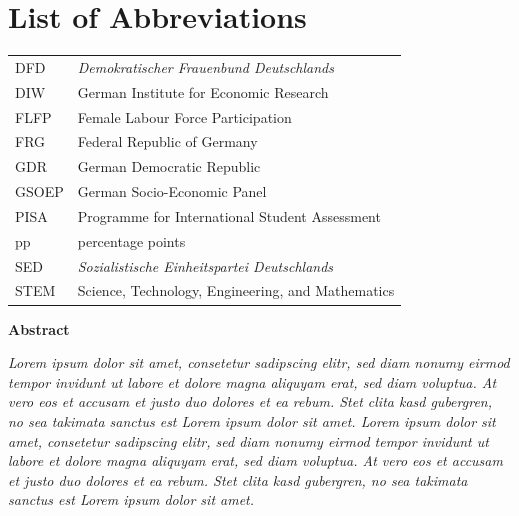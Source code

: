 \documentclass[a4paper, oneside, hyperfootnotes = false]{article}
\begin{document}
{{
{}
\section*{List of Abbreviations}
\noindent\begin{tabular}{@{}ll}
	DFD & \emph{Demokratischer Frauenbund Deutschlands} \\
    DIW & German Institute for Economic Research \\
    FLFP & Female Labour Force Participation \\
    FRG & Federal Republic of Germany \\
    GDR & German Democratic Republic \\
    GSOEP & German Socio-Economic Panel \\
    PISA & Programme for International Student Assessment \\
    pp & percentage points \\
    SED & \emph{Sozialistische Einheitspartei Deutschlands} \\
    STEM & Science, Technology, Engineering, and Mathematics
\end{tabular}

\newpage

\begin{center}
{\large\bfseries Abstract}

\vspace{5mm}

\parbox{400pt}{
    \emph{\noindent Lorem ipsum dolor sit amet, consetetur sadipscing elitr, sed diam nonumy eirmod tempor invidunt ut labore et dolore magna aliquyam erat, sed diam voluptua. At vero eos et accusam et justo duo dolores et ea rebum. Stet clita kasd gubergren, no sea takimata sanctus est Lorem ipsum dolor sit amet. Lorem ipsum dolor sit amet, consetetur sadipscing elitr, sed diam nonumy eirmod tempor invidunt ut labore et dolore magna aliquyam erat, sed diam voluptua. At vero eos et accusam et justo duo dolores et ea rebum. Stet clita kasd gubergren, no sea takimata sanctus est Lorem ipsum dolor sit amet.
    }
}

\end{center}

}%

\vspace{5mm}

\renewcommand\thesection{\arabic{section}}

}
\end{document}
